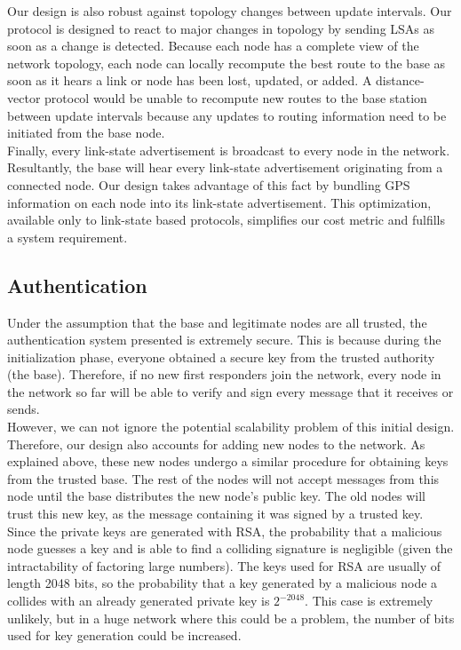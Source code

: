 \documentclass[letterpaper]{article}
\begin{document}
\noindent Our design is also robust against topology changes between update intervals. Our protocol is designed to react
to major changes in topology by sending LSAs as soon as a change is detected. Because each node has a complete view of 
the network topology, each node can locally recompute the best route to the base as soon as it hears a link or node has 
been lost, updated, or added. A distance-vector protocol would be unable to recompute new routes to the base station
between update intervals because any updates to routing information need to be initiated from the base node.
\\

\noindent Finally, every link-state advertisement is broadcast to every node in the network. Resultantly, the base
will hear every link-state advertisement originating from a connected node. Our design takes advantage of this fact by
bundling GPS information on each node into its link-state advertisement. This optimization, available only to link-state
based protocols, simplifies our cost metric and fulfills a system requirement. 

\subsection{Authentication}
Under the assumption that the base and legitimate nodes are all trusted, the authentication system presented is extremely secure. This is because during the initialization phase, everyone obtained a secure key from the trusted authority (the base). Therefore, if no new first responders join the network, every node in the network so far will be able to verify and sign every message that it receives or sends. \\

\noindent However, we can not ignore the potential scalability problem of this initial design. Therefore, our design also accounts for adding new nodes to the network. As explained above, these new nodes undergo a similar procedure for obtaining keys from the trusted base. The rest of the nodes will not accept messages from this node until the base distributes the new node's public key. The old nodes will trust this new key, as the message containing it was signed by a trusted key.
\\

\noindent Since the private keys are generated with RSA, the probability that a malicious node guesses a key and is able to find a colliding signature is negligible (given the intractability of factoring large numbers). The keys used for RSA are usually of length 2048 bits, so the probability that a key generated by a malicious node a collides with an already generated private key is $2^{-2048}$. This case is extremely unlikely, but in a huge network where this could be a problem, the number of bits used for key generation could be increased.\\
\end{document}
